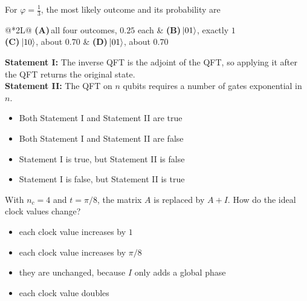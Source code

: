 \documentclass[11pt,a4paper]{article}
\newcommand{\optlabel}[1]{\textbf{(#1)}}
\newenvironment{qitem}[1]{\begin{list}{}{\setlength{\leftmargin}{3.3em}\setlength{\labelwidth}{3.1em}%
  \setlength{\labelsep}{0.2em}\setlength{\topsep}{3pt}\setlength{\parsep}{3pt}}\item[\textbf{Q.#1}\hfill]}{\end{list}}
\newcommand{\qsep}{\par\vspace{2pt}{\color{black!15}\hrule}\vspace{4pt}}
\begin{document}
\begin{qitem}{38}
For $\varphi = \tfrac13$, the most likely outcome and its probability are
\par\smallskip\noindent\begin{tabularx}{\linewidth}{@{}*{2}{L}@{}}
\optlabel{A}\,all four outcomes, $0.25$ each & \optlabel{B}\,$\ket{01}$, exactly $1$ \\[3pt]
\optlabel{C}\,$\ket{10}$, about $0.70$ & \optlabel{D}\,$\ket{01}$, about $0.70$
\end{tabularx}
\end{qitem}
\qsep

\begin{qitem}{39}
\textbf{Statement I:} The inverse QFT is the adjoint of the QFT, so applying it after the QFT returns the original state.\\[1mm]
\textbf{Statement II:} The QFT on $n$ qubits requires a number of gates exponential in $n$.
\begin{itemize}[leftmargin=2.6em, labelsep=0.4em, itemsep=2pt, topsep=3pt]
\item[\optlabel{A}] Both Statement I and Statement II are true
\item[\optlabel{B}] Both Statement I and Statement II are false
\item[\optlabel{C}] Statement I is true, but Statement II is false
\item[\optlabel{D}] Statement I is false, but Statement II is true
\end{itemize}
\end{qitem}
\qsep

\begin{qitem}{40}
With $n_c = 4$ and $t = \pi/8$, the matrix $A$ is replaced by $A + I$. How do the ideal clock values change?
\begin{itemize}[leftmargin=2.6em, labelsep=0.4em, itemsep=2pt, topsep=3pt]
\item[\optlabel{A}] each clock value increases by $1$
\item[\optlabel{B}] each clock value increases by $\pi/8$
\item[\optlabel{C}] they are unchanged, because $I$ only adds a global phase
\item[\optlabel{D}] each clock value doubles
\end{itemize}
\end{qitem}
\qsep

\newpage
\end{document}
